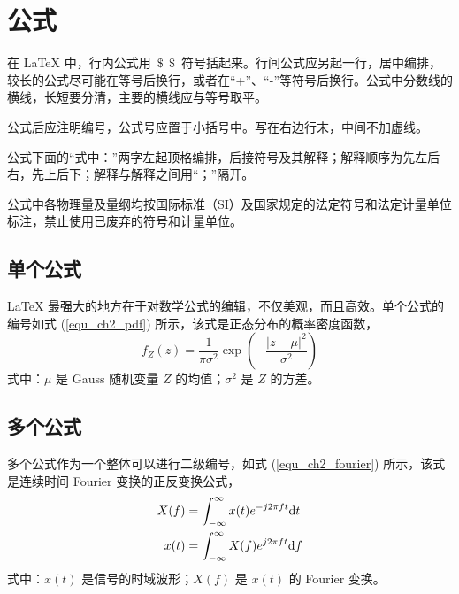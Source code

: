 \section{公式}%

在 \LaTeX{} 中，行内公式用~$\$\ \ \$$~符号括起来。行间公式应另起一行，居中编排，较长的公式尽可能在等号后换行，或者在“+”、“-”等符号后换行。公式中分数线的横线，长短要分清，主要的横线应与等号取平。

公式后应注明编号，公式号应置于小括号中。写在右边行末，中间不加虚线。

公式下面的“式中：”两字左起顶格编排，后接符号及其解释；解释顺序为先左后右，先上后下；解释与解释之间用“；”隔开。

公式中各物理量及量纲均按国际标准（SI）及国家规定的法定符号和法定计量单位标注，禁止使用已废弃的符号和计量单位。

\subsection{单个公式}%

\LaTeX{} 最强大的地方在于对数学公式的编辑，不仅美观，而且高效。单个公式的编号如式 (\ref{equ_ch2_pdf}) 所示，该式是正态分布的概率密度函数，
\begin{equation} \label{equ_ch2_pdf}
	f_Z(z) = \frac{1}{\pi\sigma^2} \exp\left(-\frac{|z-\mu|^2}{\sigma^2}\right)
\end{equation}
式中：$\mu$ 是 Gauss 随机变量 $Z$ 的均值；$\sigma^2$ 是 $Z$ 的方差。

\subsection{多个公式}%

多个公式作为一个整体可以进行二级编号，如式 (\ref{equ_ch2_fourier}) 所示，该式是连续时间 Fourier 变换的正反变换公式，
\begin{subequations} \label{equ_ch2_fourier}
	\begin{align}
		X(f) &= \int_{-\infty}^{\infty}x(t)e^{-j2\pi f t}\mathrm{d} t \\
		x(t) &= \int_{-\infty}^{\infty}X(f)e^{j2\pi f t}\mathrm{d} f
	\end{align}
\end{subequations}
式中：$x(t)$ 是信号的时域波形；$X(f)$ 是 $x(t)$ 的 Fourier 变换。

